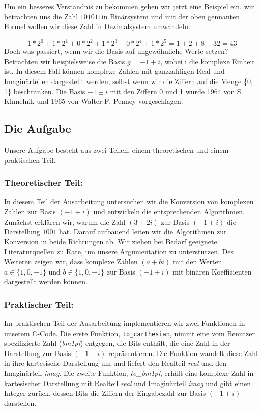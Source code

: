 \documentclass[course=erap]{aspdoc}
\begin{document}
Um ein besseres Verständnis zu bekommen gehen wir jetzt eine Beispiel ein. wir betrachten uns die Zahl $101011$\space in Binärsystem und mit der oben gennanten Formel wollen wir diese Zahl in Dezimalsystem umwandeln: 

\[1* 2^0 + 1*2^1 + 0* 2^2 + 1* 2^3 + 0* 2^4 + 1* 2^5 = 1+2+8+32 = 43 \]
Doch was passiert, wenn wir die Basis auf ungewöhnliche Werte setzen? Betrachten wir beispielsweise die Basis $g = -1 + i$, wobei i die komplexe Einheit ist. In diesem Fall können komplexe Zahlen mit ganzzahligen Real und Imaginärteilen dargestellt werden, selbst wenn wir die Ziffern auf die Menge \{0, 1\} beschränken. Die Basis $ -1 \pm i $ mit den Ziffern 0 und 1 wurde 1964 von S. Khmelnik und 1965 von Walter F. Penney vorgeschlagen.

\subsection{Die Aufgabe}

Unsere Aufgabe besteht aus zwei Teilen, einem theoretischen und einem praktischen Teil.

\subsubsection{Theoretischer Teil:}
In diesem Teil der Ausarbeitung untersuchen wir die Konversion von komplexen Zahlen zur Basis $(-1 + i)$ und entwickeln die entsprechenden Algorithmen. Zunächst erklären wir, warum die Zahl $(3 + 2i)$ zur Basis $(-1 + i)$ die Darstellung $1001$ hat. Darauf aufbauend leiten wir die Algorithmen zur Konversion in beide Richtungen ab. Wir ziehen bei Bedarf geeignete Literaturquellen zu Rate, um unsere Argumentation zu unterstützen. Des Weiteren zeigen wir, dass komplexe Zahlen $(a + bi)$ mit den Werten $a \in \{1, 0, -1\}$ und $b \in \{1, 0, -1\}$ zur Basis $(-1 + i)$ mit binären Koeffizienten dargestellt werden können.

\subsubsection{Praktischer Teil:}
Im praktischen Teil der Ausarbeitung implementieren wir zwei Funktionen in unserem C-Code. Die erste Funktion, \texttt{to\_carthesian}, nimmt eine vom Benutzer spezifizierte Zahl (\textit{bm1pi}) entgegen, die Bits enthält, die eine Zahl in der Darstellung zur Basis $(-1 + i)$ repräsentieren. Die Funktion wandelt diese Zahl in ihre kartesische Darstellung um und liefert den Realteil \textit{real} und den Imaginärteil \textit{imag}. Die zweite Funktion, \textit{to\_bm1pi}, erhält eine komplexe Zahl in kartesischer Darstellung mit Realteil \textit{real} und Imaginärteil \textit{imag} und gibt einen Integer zurück, dessen Bits die Ziffern der Eingabezahl zur Basis $(-1 + i)$ darstellen.
\end{document}
